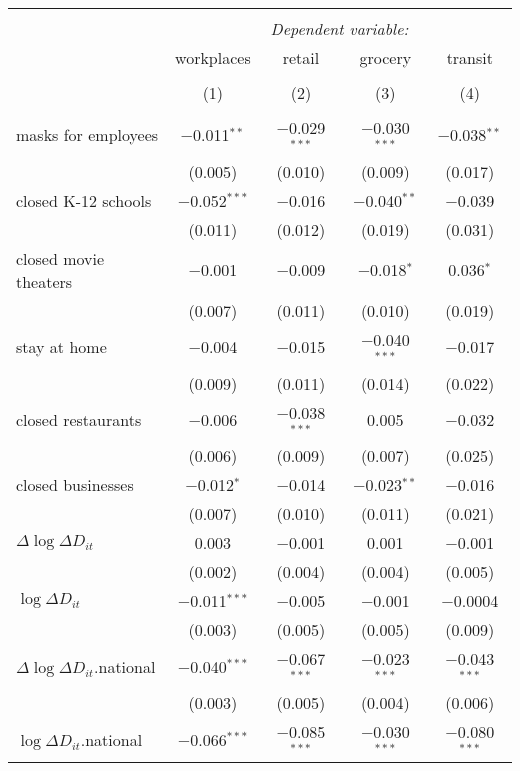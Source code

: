 \begin{tabular}{@{\extracolsep{1pt}}lcccc} 
\\[-1.8ex]\hline 
\hline \\[-1.8ex] 
 & \multicolumn{4}{c}{\textit{Dependent variable:}} \\ 
\cline{2-5} 
 & workplaces & retail & grocery & transit \\ 
\\[-1.8ex] & (1) & (2) & (3) & (4)\\ 
\hline \\[-1.8ex] 
 masks for employees & $-$0.011$^{**}$ & $-$0.029$^{***}$ & $-$0.030$^{***}$ & $-$0.038$^{**}$ \\ 
  & (0.005) & (0.010) & (0.009) & (0.017) \\ 
  closed K-12 schools & $-$0.052$^{***}$ & $-$0.016 & $-$0.040$^{**}$ & $-$0.039 \\ 
  & (0.011) & (0.012) & (0.019) & (0.031) \\ 
  closed movie theaters & $-$0.001 & $-$0.009 & $-$0.018$^{*}$ & 0.036$^{*}$ \\ 
  & (0.007) & (0.011) & (0.010) & (0.019) \\ 
  stay at home & $-$0.004 & $-$0.015 & $-$0.040$^{***}$ & $-$0.017 \\ 
  & (0.009) & (0.011) & (0.014) & (0.022) \\ 
  closed restaurants & $-$0.006 & $-$0.038$^{***}$ & 0.005 & $-$0.032 \\ 
  & (0.006) & (0.009) & (0.007) & (0.025) \\ 
  closed businesses & $-$0.012$^{*}$ & $-$0.014 & $-$0.023$^{**}$ & $-$0.016 \\ 
  & (0.007) & (0.010) & (0.011) & (0.021) \\ 
  $\Delta \log \Delta D_{it}$ & 0.003 & $-$0.001 & 0.001 & $-$0.001 \\ 
  & (0.002) & (0.004) & (0.004) & (0.005) \\ 
  $\log \Delta D_{it}$ & $-$0.011$^{***}$ & $-$0.005 & $-$0.001 & $-$0.0004 \\ 
  & (0.003) & (0.005) & (0.005) & (0.009) \\ 
  $\Delta \log \Delta D_{it}$.national & $-$0.040$^{***}$ & $-$0.067$^{***}$ & $-$0.023$^{***}$ & $-$0.043$^{***}$ \\ 
  & (0.003) & (0.005) & (0.004) & (0.006) \\ 
  $\log \Delta D_{it}$.national & $-$0.066$^{***}$ & $-$0.085$^{***}$ & $-$0.030$^{***}$ & $-$0.080$^{***}$ \\ 

\end{tabular}
